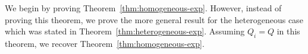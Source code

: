 \documentclass[journal]{IEEEtran}
\newcommand{\1}{\mathbf{1}}
\begin{document}


We begin by proving Theorem~\ref{thm:homogeneous-exp}. However, instead of proving this theorem, we prove the more general result for the heterogeneous case which was stated in Theorem~\ref{thm:heterogeneous-exp}. Assuming $Q_i = Q$ in this theorem, we recover Theorem~\ref{thm:homogeneous-exp}.
\end{document}
